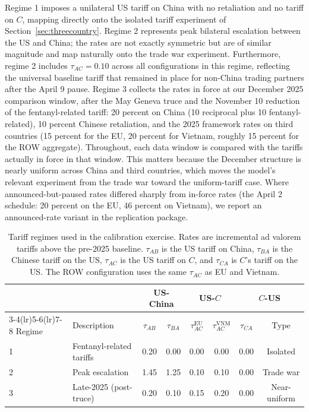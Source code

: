 \documentclass[11pt]{article}
\theoremstyle{plain}
\theoremstyle{remark}
\numberwithin{lemma}{section}
\numberwithin{proposition}{section}
\numberwithin{corollary}{section}
\newcommand{\rev}[1]{{\color{RevBlue}#1}}
\begin{document}
Regime 1 imposes a unilateral US tariff on China with no retaliation and no tariff on $C$, mapping directly onto the isolated tariff experiment of Section~\ref{sec:threecountry}. Regime 2 represents peak bilateral escalation between the US and China; the rates are not exactly symmetric but are of similar magnitude and map naturally onto the trade war experiment. Furthermore, regime 2 includes $\tau_{AC} = 0.10$ across all configurations in this regime, reflecting the universal baseline tariff that remained in place for non-China trading partners after the April 9 pause. \rev{Regime 3 collects the rates in force at our December 2025 comparison window, after the May Geneva truce and the November 10 reduction of the fentanyl-related tariff: 20 percent on China (10 reciprocal plus 10 fentanyl-related), 10 percent Chinese retaliation, and the 2025 framework rates on third countries (15 percent for the EU, 20 percent for Vietnam, roughly 15 percent for the ROW aggregate). Throughout, each data window is compared with the tariffs actually in force in that window. This matters because the December structure is nearly uniform across China and third countries, which moves the model's relevant experiment from the trade war toward the uniform-tariff case. Where announced-but-paused rates differed sharply from in-force rates (the April 2 schedule: 20 percent on the EU, 46 percent on Vietnam), we report an announced-rate variant in the replication package.}

\begin{table}[htbp]
\centering
\begin{tabular}{llcccccc}
\hline
& & \multicolumn{2}{c}{US-China} & \multicolumn{2}{c}{US-$C$} & \multicolumn{2}{c}{$C$-US} \\
\cmidrule(lr){3-4}\cmidrule(lr){5-6}\cmidrule(lr){7-8}
Regime & Description & $\tau_{AB}$ & $\tau_{BA}$ & $\tau_{AC}^{\mathrm{EU}}$ & $\tau_{AC}^{\mathrm{VNM}}$ & $\tau_{CA}$ & Type \\
\hline
1 & Fentanyl-related tariffs        & 0.20 & 0.00 & 0.00 & 0.00 & 0.00 & Isolated \\
2 & Peak escalation                 & 1.45 & 1.25 & 0.10 & 0.10 & 0.00 & Trade war \\
\rev{3} & \rev{Late-2025 (post-truce)} & \rev{0.20} & \rev{0.10} & \rev{0.15} & \rev{0.20} & \rev{0.00} & \rev{Near-uniform} \\
\hline
\end{tabular}
\caption{Tariff regimes used in the calibration exercise. Rates are incremental ad valorem tariffs above the pre-2025 baseline. $\tau_{AB}$ is the US tariff on China, $\tau_{BA}$ is the Chinese tariff on the US, $\tau_{AC}$ is the US tariff on $C$, and $\tau_{CA}$ is $C$'s tariff on the US. The ROW configuration uses the same $\tau_{AC}$ as EU and Vietnam.}
\label{tab:tariff_regimes}
\end{table}
\end{document}
